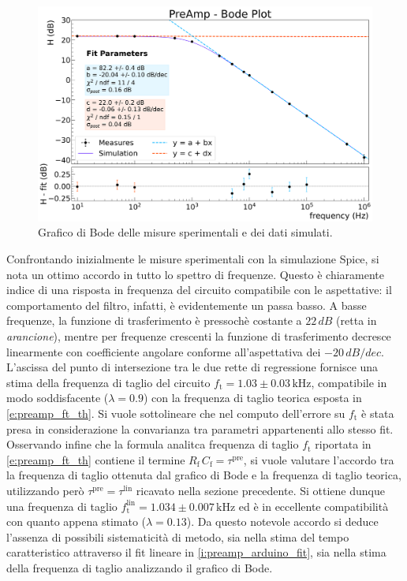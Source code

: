 \documentclass[a4paper,11pt]{article} %
\begin{document}
\begin{figure}[H]
	\centering
	\includegraphics[width=0.9\linewidth]{../Plots/PreAmp/bode_plot.png}
	\caption{\small Grafico di Bode delle misure sperimentali e dei dati simulati.}
	\label{i:preamp_thebode}
\end{figure}
\noindent Confrontando inizialmente le misure sperimentali con la simulazione Spice, si nota un ottimo accordo in tutto
lo spettro di frequenze. Questo è chiaramente indice di una risposta in frequenza del circuito compatibile con le
aspettative: il comportamento del filtro, infatti, è evidentemente un passa basso. A basse frequenze, la funzione di
trasferimento è pressochè costante a $22\,\si{dB}$ (retta in \textit{arancione}), mentre per frequenze crescenti la
funzione di trasferimento decresce linearmente con coefficiente angolare conforme all'aspettativa dei
$-20\,\si{dB/dec}$. L'ascissa del punto di intersezione tra le due rette di regressione fornisce una stima della
frequenza di taglio del circuito $f_{\text{t}} = 1.03 \pm 0.03 \,\si{\kHz}$, compatibile in modo soddisfacente ($\lambda
= 0.9$) con la frequenza di taglio teorica esposta in \autoref{e:preamp_ft_th}. Si vuole sottolineare che nel computo
dell'errore su $f_{\text{t}}$ è stata presa in considerazione la convarianza tra parametri appartenenti allo stesso fit.
Osservando infine che la formula analitca frequenza di taglio $f_{\text{t}}$ riportata in \autoref{e:preamp_ft_th}
contiene il termine $R_{\text{f}} \, C_{\text{f}}=\tau^{\text{pre}}$, si vuole valutare l'accordo tra la frequenza di
taglio ottenuta dal grafico di Bode e la frequenza di taglio teorica, utilizzando però
$\tau^{\text{pre}}=\tau^{\text{lin}}$ ricavato nella sezione precedente. Si ottiene dunque una frequenza di taglio
$f_{\text{t}}^{\text{lin}} = 1.034 \pm 0.007 \,\si{\kHz}$ ed è in eccellente compatibilità con quanto appena stimato
($\lambda = 0.13$). Da questo notevole accordo si deduce l'assenza di possibili sistematicità di metodo, sia nella stima
del tempo caratteristico attraverso il fit lineare in \autoref{i:preamp_arduino_fit}, sia nella stima della frequenza di
taglio analizzando il grafico di Bode. 
\end{document}
